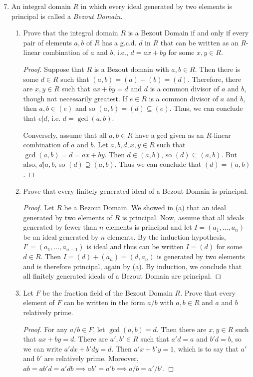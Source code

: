 \documentclass{report}
\begin{document}
\begin{enumerate}
	\setcounter{enumi}{6}
	\item An integral domain $R$ in which every ideal generated by two elements is principal is called a \textit{Bezout Domain}.
	\begin{enumerate}
	   \item Prove that the integral domain $R$ is a Bezout Domain if and only if every pair of elements $a,b$ of $R$ has a g.c.d. $d$ in $R$
	   that can be written as an $R$-linear combination of $a$ and $b$, i.e., $d=ax+by$ for some $x,y\in R$.
	   \begin{proof}
	      Suppose that $R$ is a Bezout domain with $a,b\in R$. Then there is some $d\in R$ such that $(a,b)=(a)+(b)=(d)$.
	      Therefore, there are $x,y\in R$ such that $ax+by= d$ and $d$ is a common divisor of $a$ and $b$, though not necessarily greatest.
	      If $e\in R$ is a common divisor of $a$ and $b$, then $a,b\in(e)$ and so $(a,b)=(d)\subseteq (e)$.
	      Thus, we can conclude that $e|d$, i.e. $d=\gcd(a,b)$.
	      \bigskip

	      \noindent
	      Conversely, assume that all $a,b\in R$ have a gcd given as an $R$-linear combination of $a$ and $b$.
	      Let $a,b,d,x,y\in R$ such that $\gcd(a,b)=d=ax+by$. Then $d\in(a,b)$, so $(d)\subseteq(a,b)$.
	      But also, $d|a,b$, so $(d)\supseteq(a,b)$. Thus we can conclude that $(d)=(a,b)$.
	   \end{proof}
	   \item Prove that every finitely generated ideal of a Bezout Domain is principal.
	   \begin{proof}
	      Let $R$ be a Bezout Domain. We showed in (a) that an ideal generated by two elements of $R$ is principal.
	      Now, assume that all ideals generated by fewer than $n$ elements is principal and let $I=(a_1,...,a_n)$ be an ideal generated by $n$ elements.
	      By the induction hypothesis, $I'=(a_1,...,a_{n-1})$ is ideal and thus can be written $I=(d)$ for some $d\in R$.
	      Then $I=(d)+(a_n)=(d,a_n)$ is generated by two elements and is therefore principal, again by (a). 
	      By induction, we conclude that all finitely generated ideals of a Bezout Domain are principal.
	   \end{proof}
	   \item Let $F$ be the fraction field of the Bezout Domain $R$. 
	   Prove that every element of $F$ can be written in the form $a/b$ with $a,b\in R$ and $a$ and $b$ relatively prime.
	   \begin{proof}
	       For any $a/b\in F$, let $\gcd(a,b)=d$. Then there are $x,y\in R$ such that $ax+by=d$.
	       There are $a',b'\in R$ such that $a'd=a$ and $b'd=b$, so we can write $a'dx+b'dy=d$.
	       Then $a'x+b'y=1$, which is to say that $a'$ and $b'$ are relatively prime.
	       Moreover, $ab=ab'd=a'db\implies ab'=a'b \implies a/b = a'/b'$.
	   \end{proof}
	    
	\end{enumerate}
\end{enumerate}
\end{document}
